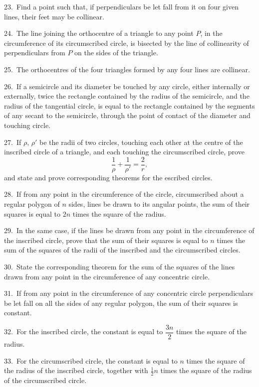 \documentclass[oneside]{book}
\begin{document}
\begin{footnotesize}
23.~Find a point such that, if perpendiculars be let fall from it
on four given lines, their feet may be collinear.

24.~The line joining the orthocentre of a triangle to any point
$P$, in the circumference of its circumscribed circle, is bisected by
the line of collinearity of perpendiculars from $P$ on the sides of
the triangle.

25.~The orthocentres of the four triangles formed by any four
lines are collinear.

26.~If a semicircle and its diameter be touched by any circle,
either internally or externally, twice the rectangle contained by
the radius of the semicircle, and the radius of the tangential circle,
is equal to the rectangle contained by the segments of any secant
to the semicircle, through the point of contact of the diameter and
touching circle.

27.~If $\rho$, $\rho'$ be the radii of two circles, touching each other at
the centre of the inscribed circle of a triangle, and each touching
the circumscribed circle, prove
\[
\frac{ 1 }{\rho} + \frac{1 }{\rho'}  = \frac{2 }{r} ,
\]
and state and prove corresponding theorems for the escribed
circles.

28.~If from any point in the circumference of the circle, circumscribed
about a regular polygon of $n$ sides, lines be drawn to
its angular points, the sum of their squares is equal to $2n$ times
the square of the radius.

29.~In the same case, if the lines be drawn from any point in
the circumference of the inscribed circle, prove that the sum of
their squares is equal to $n$ times the sum of the squares of the
radii of the inscribed and the circumscribed circles.

30.~State the corresponding theorem for the sum of the squares
of the lines drawn from any point in the circumference of any
concentric circle.

31.~If from any point in the circumference of any concentric
circle perpendiculars be let fall on all the sides of any regular
polygon, the sum of their squares is constant.

32.~For the inscribed circle, the constant is equal to $\dfrac{3n}{ 2}$ times
the square of the radius.

33.~For the circumscribed circle, the constant is equal to $n$
times the square of the radius of the inscribed circle, together with
$\frac{ 1}{ 2} n$ times the square of the radius of the circumscribed circle.


\end{footnotesize}
\end{document}

